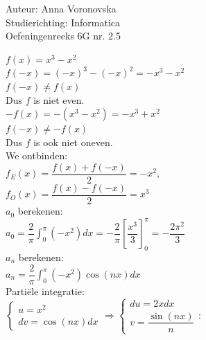 \documentclass[a4paper]{article}
\begin{document}
  
\noindent \large Auteur: Anna Voronovska \\
\noindent \large Studierichting: Informatica\\
\noindent \large Oefeningenreeks 6G nr. 2.5\\

\medskip

\normalsize

$f(x) = x^3 - x^2$\\

$f(-x)=(-x)^3-(-x)^2=-x^3-x^2$\\

$f(-x)\neq f(x)$\\

Dus $f$ is niet even.\\

$-f(x)=-(x^3-x^2)=-x^3+x^2$\\

$f(-x)\neq -f(x)$\\

Dus $f$ is ook niet oneven.\\

We ontbinden:\\

$f_E(x) = \dfrac{f(x)+f(-x)}{2} = -x^2,$\\

$f_O(x) = \dfrac{f(x)-f(-x)}{2} = x^3$\\

$a_0$ berekenen:\\

$a_0 = \dfrac{2}{\pi}\displaystyle\int_0^{\pi} (-x^2)dx
= -\dfrac{2}{\pi}\left[\dfrac{x^3}{3}\right]_0^{\pi}
= -\dfrac{2\pi^2}{3}$\\

$a_n$ berekenen:\\

$a_n = \dfrac{2}{\pi}\displaystyle\int_0^{\pi} (-x^2)\cos(nx)dx$\\

Parti\"ele integratie:\\

$\left\{ \begin{array}{l} 
    u = x^2 \\ 
    dv = \cos(nx)  dx 
\end{array} \right.
\Rightarrow
\left\{ \begin{array}{l} 
    du = 2x  dx \\ 
    v = \dfrac{\sin(nx)}{n} 
\end{array} \right.$:\\
\end{document}
